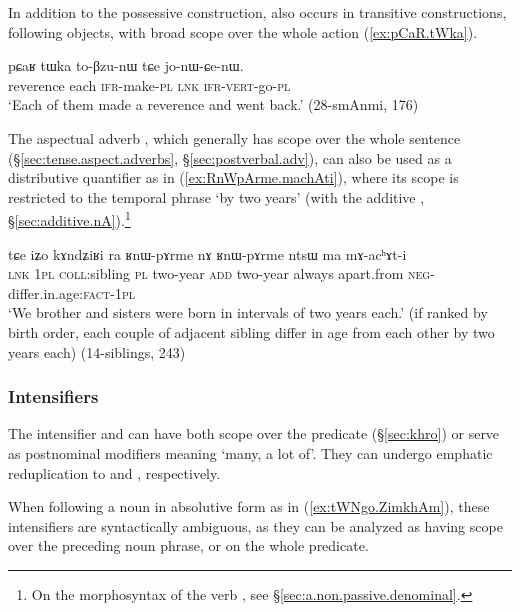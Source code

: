 In addition to the possessive construction,  also occurs in transitive constructions, following objects, with broad scope over the whole action (\ref{ex:pCaR.tWka}).

\begin{exe}
\ex \label{ex:pCaR.tWka}
\gll  pɕaʁ tɯka to-βzu-nɯ tɕe jo-nɯ-ɕe-nɯ.  \\
reverence each \textsc{ifr}-make-\textsc{pl} \textsc{lnk} \textsc{ifr}-\textsc{vert}-go-\textsc{pl} \\
\glt `Each of them made a reverence and went back.'  (28-smAnmi, 176)
\end{exe}

The aspectual adverb , which generally has scope over the whole sentence (§\ref{sec:tense.aspect.adverbs}, §\ref{sec:postverbal.adv}), can also be used as a distributive quantifier as in (\ref{ex:RnWpArme.machAti}), where its scope is restricted to the temporal phrase  `by two years' (with the additive , §\ref{sec:additive.nA}).\footnote{On the morphosyntax of the verb , see §\ref{sec:a.non.passive.denominal}.  }

\begin{exe}
\ex   \label{ex:RnWpArme.machAti}
 \gll tɕe iʑo kɤndʑiʁi ra ʁnɯ-pɤrme nɤ ʁnɯ-pɤrme ntsɯ ma mɤ-acʰɤt-i \\
 \textsc{lnk} \textsc{1pl} \textsc{coll}:sibling \textsc{pl} two-year \textsc{add} two-year always apart.from \textsc{neg}-differ.in.age:\textsc{fact}-\textsc{1pl} \\
\glt `We brother and sisters were born in intervals of two years each.' (if ranked by birth order, each couple of adjacent sibling differ in age from each other by two years each) (14-siblings, 243)
 \end{exe}
 
\subsubsection{Intensifiers} \label{sec:nominal.intensifier}
The intensifier  and  can have both scope over the predicate (§\ref{sec:khro}) or serve as postnominal modifiers meaning `many, a lot of'. They can undergo emphatic reduplication to  and , respectively.

When following a noun in absolutive form as in (\ref{ex:tWNgo.ZimkhAm}), these intensifiers are syntactically ambiguous, as they can be analyzed as having scope over the preceding noun phrase, or on the whole predicate.

